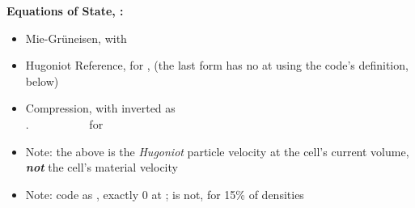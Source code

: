 \documentclass[11pt,addpoints]{exam}
\begin{document}
\begin{tcolorbox}[breakable]
\textbf{Equations of State, :}\vspace{.5em}
\begin{itemize}
\item Mie-Gr\"uneisen, \hspace{3mm}  \hspace{5mm} with \vspace{.5em}
\item Hugoniot Reference, \hspace{3mm}  \hspace{5mm}  \hspace{5mm} for ,  \hspace{5mm} (the last form has no  at  using the code's \bm{$\eta$} definition, below)\vspace{.5em}
\item Compression, \hspace{3mm}  \hspace{5mm}  \hspace{5mm} with \hspace{2mm}  inverted as\vspace{.5em}\\
.~~~~~~~~~~ \hspace{7mm} for \vspace{.5em}
\item Note: the  above is the \emph{Hugoniot} particle velocity at the cell's current volume, \textbf{\emph{not}} the cell's material velocity \vspace{.5em}
\item Note: code \bm{$\eta$} as , exactly 0 at ;  is not, for 15\% of densities
\end{itemize}
\end{tcolorbox}
\end{document}
